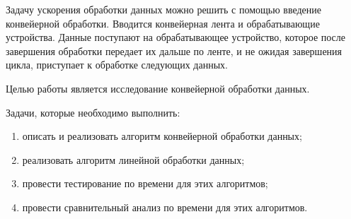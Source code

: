 \hspace{\parindent}
Задачу ускорения обработки данных можно решить с помощью введение конвейерной обработки. Вводится конвейерная лента и обрабатывающие устройства. Данные поступают на обрабатывающее устройство, которое после завершения обработки передает их дальше по ленте, и не ожидая завершения цикла, приступает к обработке следующих  данных.   

\hspace{\parindent}
Целью работы является исследование конвейерной обработки данных.

\hspace{\parindent}
Задачи, которые необходимо выполнить:
\begin{enumerate}
	\item описать и реализовать алгоритм конвейерной обработки данных;
	\item реализовать алгоритм линейной обработки данных;
    \item провести тестирование по времени для этих алгоритмов;
    \item провести сравнительный анализ по времени для этих алгоритмов.
\end{enumerate}